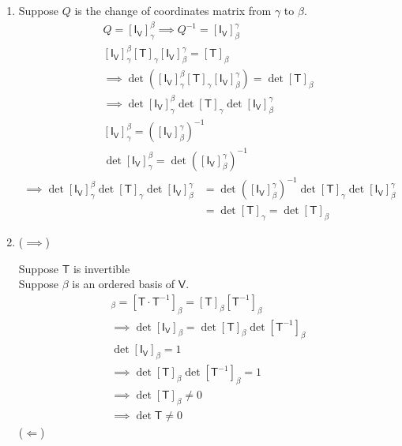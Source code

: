 \begin{enumerate}
\item
Suppose $Q$ is the change of coordinates matrix from $\gamma$ to
$\beta$.
\begin{gather}
Q=[\mathsf{I}_\mathsf{V}]_\gamma^\beta \implies
Q^{-1}=[\mathsf{I}_\mathsf{V}]^\gamma_\beta \\
[\mathsf{I}_\mathsf{V}]_\gamma^\beta
[\mathsf{T}]_\gamma[\mathsf{I}_\mathsf{V}]^\gamma_\beta =
[\mathsf{T}]_\beta\\
\implies \det{([\mathsf{I}_\mathsf{V}]_\gamma^\beta
[\mathsf{T}]_\gamma[\mathsf{I}_\mathsf{V}]^\gamma_\beta)} =
\det{[\mathsf{T}]_\beta}\\
\implies\det{[\mathsf{I}_\mathsf{V}]_\gamma^\beta}
\det{[\mathsf{T}]_\gamma}\det{[\mathsf{I}_\mathsf{V}]^\gamma_\beta}\\
[\mathsf{I}_\mathsf{V}]_\gamma^\beta =
([\mathsf{I}_\mathsf{V}]^\gamma_\beta)^{-1}\\
\det{[\mathsf{I}_\mathsf{V}]_\gamma^\beta}=
\det{([\mathsf{I}_\mathsf{V}]^\gamma_\beta)^{-1}}
\end{gather}
\begin{align}
\implies \det{[\mathsf{I}_\mathsf{V}]_\gamma^\beta}
\det{[\mathsf{T}]_\gamma}\det{[\mathsf{I}_\mathsf{V}]^\gamma_\beta} &=
\det{([\mathsf{I}_\mathsf{V}]^\gamma_\beta)^{-1}}\det{[\mathsf{T}]_\gamma}\det{[\mathsf{I}_\mathsf{V}]^\gamma_\beta}\\
&= \det[\mathsf{T}]_\gamma = \det[\mathsf{T}]_\beta
\end{align}
\item 
($\implies$) 

Suppose $\mathsf{T}$ is invertible\\
Suppose $\beta$ is an ordered basis of $\mathsf{V}$.
\begin{gather}
[\mathsf{I}_\mathsf{V}]_\beta = [\mathsf{T}\cdot\mathsf{T}^{-1}]_\beta
= [\mathsf{T}]_\beta[\mathsf{T}^{-1}]_\beta\\
\implies \det{[\mathsf{I}_\mathsf{V}]_\beta} =
\det{[\mathsf{T}]_\beta}\det{[\mathsf{T}^{-1}]_\beta}\\
\det{[\mathsf{I}_\mathsf{V}]_\beta} =1 \\
\implies \det{[\mathsf{T}]_\beta}\det{[\mathsf{T}^{-1}]_\beta} =1\\
\implies \det{[\mathsf{T}]_\beta} \neq 0\\
\implies \det{\mathsf{T}} \neq 0
\end{gather}
($\Leftarrow$)


\end{enumerate}
